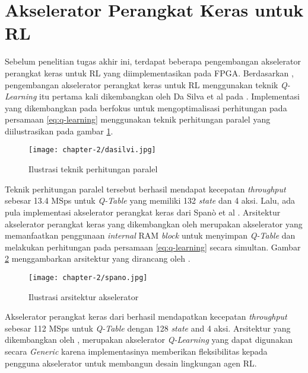 \section{Akselerator Perangkat Keras untuk \acl{RL}}
\label{sec:accelerator-researches}

Sebelum penelitian tugas akhir ini, terdapat beberapa pengembangan akselerator perangkat keras untuk \ac{RL} yang diimplementasikan pada \ac{FPGA}. Berdasarkan \parencite{sutisna2023faraneq}, pengembangan akselerator perangkat keras untuk \ac{RL} menggunakan teknik \textit{Q-Learning} itu pertama kali dikembangkan oleh Da Silva et al pada \parencite{dasilva2019parallel}. Implementasi yang dikembangkan pada \parencite{dasilva2019parallel} berfokus untuk mengoptimalisasi perhitungan pada persamaan \ref{eq:q-learning} menggunakan teknik perhitungan paralel yang diilustrasikan pada gambar \ref{fig:ilustrasi-dasilvi}.

\begin{figure}[h]
	\centering
	\texttt{[image: chapter-2/dasilvi.jpg]}
	\caption{Ilustrasi teknik perhitungan paralel \parencite{dasilva2019parallel}}
	\label{fig:ilustrasi-dasilvi}
\end{figure}

Teknik perhitungan paralel tersebut berhasil mendapat kecepatan \textit{throughput} sebesar 13.4  \ac{MSps} untuk \textit{Q-Table} yang memiliki 132 \textit{state} dan 4 aksi. Lalu, ada pula implementasi akselerator perangkat keras dari Spanò et al \parencite{spano2019efficient}. Arsitektur akselerator perangkat keras yang dikembangkan oleh \parencite{spano2019efficient} merupakan akselerator yang memanfaatkan penggunaan \textit{internal} \ac{RAM} \textit{block} untuk menyimpan \textit{Q-Table} dan melakukan perhitungan pada persamaan \ref{eq:q-learning} secara simultan. Gambar \ref{fig:ilustrasi-spano} menggambarkan arsitektur yang dirancang oleh \parencite{spano2019efficient}.

\begin{figure}[h]
	\centering
	\texttt{[image: chapter-2/spano.jpg]}
	\caption{Ilustrasi arsitektur akselerator \parencite{spano2019efficient}}
	\label{fig:ilustrasi-spano}
\end{figure}

Akselerator perangkat keras dari \parencite{spano2019efficient} berhasil mendapatkan kecepatan \textit{throughput} sebesar 112 MSps untuk \textit{Q-Table} dengan 128 \textit{state} and 4 aksi. Arsitektur yang dikembangkan oleh \parencite{spano2019efficient}, merupakan akselerator \textit{Q-Learning} yang dapat digunakan secara \textit{Generic} karena implementasinya memberikan fleksibilitas kepada pengguna akselerator untuk membangun desain lingkungan agen \ac{RL}.

